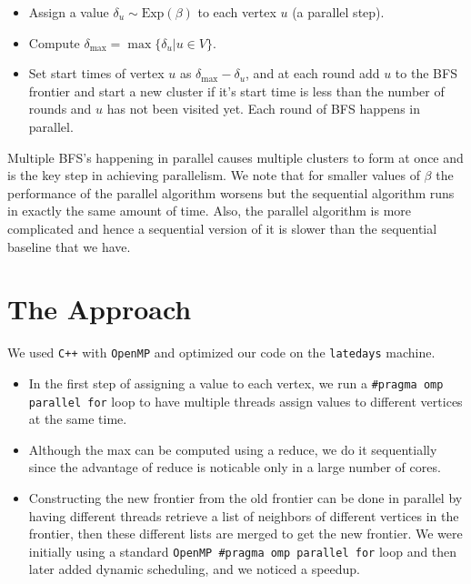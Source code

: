 \documentclass[11pt]{scrartcl}
\theoremstyle{plain}
\theoremstyle{definition}
\theoremstyle{remark}
\begin{document}
\begin{itemize}

\item Assign a value $\delta_u\sim\text{Exp}(\beta)$ to each vertex $u$ (a parallel step).

\item Compute $\delta_{\text{max}} = \max\{\delta_u|u\in V\}$.

\item Set start times of vertex $u$ as $\delta_{\text{max}}-\delta_u$, and at each round add $u$
to the BFS frontier and start a new cluster if it's start time is less than the number of rounds
and $u$ has not been visited yet. Each round of BFS happens in parallel.

\end{itemize}

Multiple BFS's happening in parallel causes multiple clusters to form at once and is the key step in
achieving parallelism. We note that for smaller values of
$\beta$ the performance of the parallel algorithm worsens
but the sequential algorithm runs in exactly the same
amount of time. Also, the parallel algorithm is more
complicated and hence a sequential version of it is
slower than the sequential baseline that we have.

\section{The Approach}
We used \texttt{C++} with \texttt{OpenMP} and optimized our code on the \texttt{latedays} machine.

\begin{itemize}
\item In the first step of assigning a value to each vertex,
we run a \texttt{\#pragma omp parallel for} loop to
have multiple threads assign values to different vertices
at the same time.

\item Although the max can be computed using a reduce, we do
it sequentially since the advantage of reduce is noticable
only in a large number of cores.

\item Constructing the new frontier from the old frontier
can be done in parallel by having different threads
retrieve a list of neighbors of different vertices
in the frontier, then these different lists are merged
to get the new frontier. We were initially using
a standard \texttt{OpenMP \#pragma omp parallel for}
loop and then later added dynamic scheduling, and we noticed
a speedup.

\end{itemize}
\end{document}
